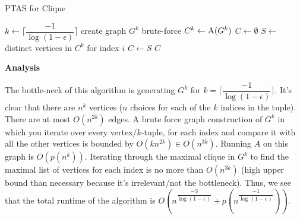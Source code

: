 \documentclass{article}
\begin{document}
\begin{algorithm}
    \caption{PTAS for Clique}\label{euclid}
    \begin{algorithmic}[1]
        \State $k \gets \lceil \dfrac{-1}{\log (1 - \epsilon)} \rceil$
        \State create graph $G^k$ brute-force
        \State $C^k \gets \Call{A}{G^k}$
        \State $C \gets \emptyset$
            \State $S \gets$ distinct vertices in $C^k$ for index $i$
                \State $C \gets S$
            \EndIf
        \EndFor
        \State \Return $C$
    \end{algorithmic}
\end{algorithm}

\textbf{Analysis}

The bottle-neck of this algorithm is generating $G^k$ for $k = \lceil \dfrac{-1}{\log ( 1 - \epsilon )} \rceil$. It's
clear that there are $n^k$ vertices ($n$ choices for each of the $k$ indices in the tuple). There are at most
$O(n^{2k})$ edges. A brute force graph construction of $G^k$ in which you iterate over every vertex/$k$-tuple, for each
index and compare it with all the other vertices is bounded by $O(k n^{2k}) \in O(n^{3k})$. Running $A$ on this graph is
$O(p(n^{k}))$.  Iterating through the maximal clique in $G^k$ to find the maximal list of vertices for each index is no
more than $O(n^{3k})$ (high upper bound than necessary because it's irrelevant/not the bottleneck). Thus, we see that
the total runtime of the algorithm is $O(n^{\dfrac{-3}{\log(1 - \epsilon)}} + p(n^{\dfrac{-1}{\log (1- \epsilon)}}))$.
\end{document}

